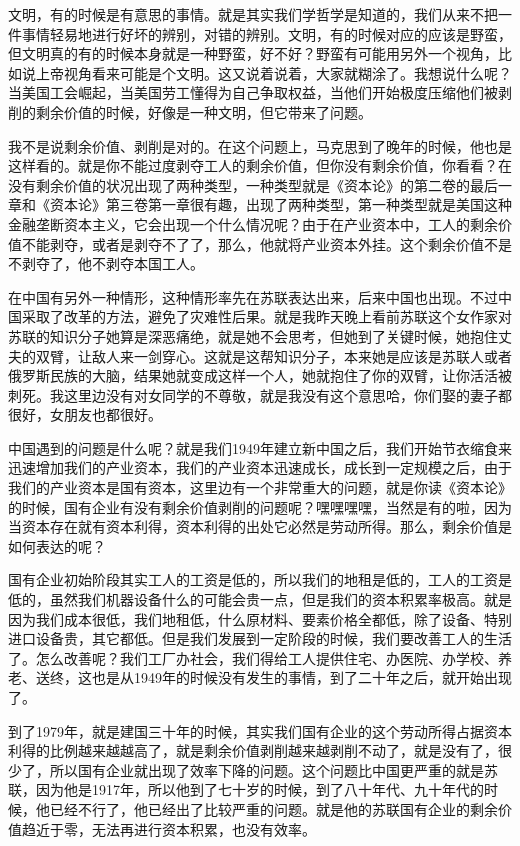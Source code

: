 \documentclass[UTF8, 12pt, a4paper]{ctexrep}
\begin{document}
文明，有的时候是有意思的事情。就是其实我们学哲学是知道的，我们从来不把一件事情轻易地进行好坏的辨别，对错的辨别。文明，有的时候对应的应该是野蛮，但文明真的有的时候本身就是一种野蛮，好不好？野蛮有可能用另外一个视角，比如说上帝视角看来可能是个文明。这又说着说着，大家就糊涂了。我想说什么呢？当美国工会崛起，当美国劳工懂得为自己争取权益，当他们开始极度压缩他们被剥削的剩余价值的时候，好像是一种文明，但它带来了问题。

我不是说剩余价值、剥削是对的。在这个问题上，马克思到了晚年的时候，他也是这样看的。就是你不能过度剥夺工人的剩余价值，但你没有剩余价值，你看看？在没有剩余价值的状况出现了两种类型，一种类型就是《资本论》的第二卷的最后一章和《资本论》第三卷第一章很有趣，出现了两种类型，第一种类型就是美国这种金融垄断资本主义，它会出现一个什么情况呢？由于在产业资本中，工人的剩余价值不能剥夺，或者是剥夺不了了，那么，他就将产业资本外挂。这个剩余价值不是不剥夺了，他不剥夺本国工人。

在中国有另外一种情形，这种情形率先在苏联表达出来，后来中国也出现。不过中国采取了改革的方法，避免了灾难性后果。就是我昨天晚上看前苏联这个女作家对苏联的知识分子她算是深恶痛绝，就是她不会思考，但她到了关键时候，她抱住丈夫的双臂，让敌人来一剑穿心。这就是这帮知识分子，本来她是应该是苏联人或者俄罗斯民族的大脑，结果她就变成这样一个人，她就抱住了你的双臂，让你活活被刺死。我这里边没有对女同学的不尊敬，就是我没有这个意思哈，你们娶的妻子都很好，女朋友也都很好。

中国遇到的问题是什么呢？就是我们1949年建立新中国之后，我们开始节衣缩食来迅速增加我们的产业资本，我们的产业资本迅速成长，成长到一定规模之后，由于我们的产业资本是国有资本，这里边有一个非常重大的问题，就是你读《资本论》的时候，国有企业有没有剩余价值剥削的问题呢？嘿嘿嘿嘿，当然是有的啦，因为当资本存在就有资本利得，资本利得的出处它必然是劳动所得。那么，剩余价值是如何表达的呢？

国有企业初始阶段其实工人的工资是低的，所以我们的地租是低的，工人的工资是低的，虽然我们机器设备什么的可能会贵一点，但是我们的资本积累率极高。就是因为我们成本很低，我们地租低，什么原材料、要素价格全都低，除了设备、特别进口设备贵，其它都低。但是我们发展到一定阶段的时候，我们要改善工人的生活了。怎么改善呢？我们工厂办社会，我们得给工人提供住宅、办医院、办学校、养老、送终，这也是从1949年的时候没有发生的事情，到了二十年之后，就开始出现了。

到了1979年，就是建国三十年的时候，其实我们国有企业的这个劳动所得占据资本利得的比例越来越越高了，就是剩余价值剥削越来越剥削不动了，就是没有了，很少了，所以国有企业就出现了效率下降的问题。这个问题比中国更严重的就是苏联，因为他是1917年，所以他到了七十岁的时候，到了八十年代、九十年代的时候，他已经不行了，他已经出了比较严重的问题。就是他的苏联国有企业的剩余价值趋近于零，无法再进行资本积累，也没有效率。
\end{document}
